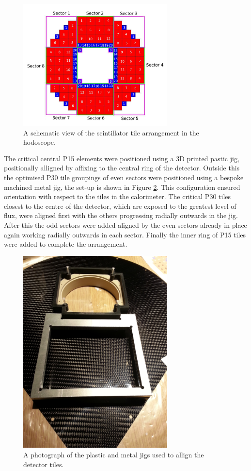 \begin{figure}[!ht]
	\centering
	\includegraphics[width=0.7\textwidth]{ImgChap1/hodoelements}
	\caption{A schematic view of the scintillator tile arrangement in the hodoscope.}
	\label{hodoelements}
\end{figure}
	

The critical central P15 elements were positioned using a 3D printed pastic jig, positionally alligned by affixing to the central ring of the detector. Outside this the optimised P30 tile groupings of even sectors were positioned using a bespoke machined metal jig, the set-up is shown in Figure \ref{tilejig}. This configuration ensured orientation with respect to the tiles in the calorimeter. The critical P30 tiles closest to the centre of the detector, which are exposed to the greatest level of flux, were aligned first with the others progressing radially outwards in the jig. After this the odd sectors were added aligned by the even sectors already in place again working radially outwards in each sector. Finally the inner ring of P15 tiles were added to complete the arrangement.

\begin{figure}[!ht]
	\centering
	\includegraphics[width=0.7\textwidth]{ImgChap1/jig}
	\caption{A photograph of the plastic and metal jigs used to allign the detector tiles.}
	\label{tilejig}
\end{figure}

